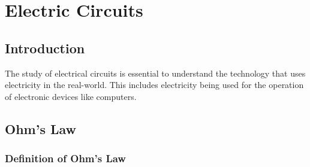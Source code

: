 \chapter{Electric Circuits}
\label{p:em:ec11}


\section{Introduction}

The study of electrical circuits is essential to understand the technology that uses electricity in the real-world. This includes electricity being used for the operation of electronic devices like computers.



\section{Ohm's Law}

\subsection{Definition of Ohm's Law}

